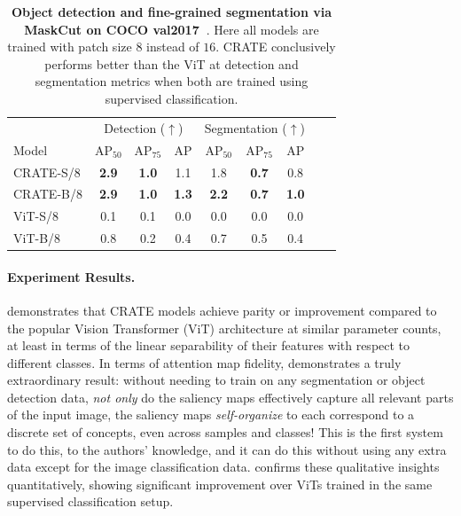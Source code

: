 \documentclass[../../book-main.tex]{subfiles}
\begin{document}
\begin{table}
\caption{\small \textbf{Object detection and fine-grained
    segmentation via MaskCut on COCO {val2017}~\citep{lin2014microsoft}}.
    Here all models are trained with patch size \(8\) instead of \(16\).
    CRATE conclusively performs better than the ViT at detection and
segmentation metrics when both are trained using supervised classification.}
\centering
\begin{tabular}{@{}lcccccccc@{}}
    \toprule
    &  \multicolumn{3}{c}{Detection (\(\uparrow\))} &
    \multicolumn{3}{c}{Segmentation (\(\uparrow\))} \\
    Model & AP$_{50}$ & AP$_{75}$ & AP & AP$_{50}$ & AP$_{75}$ & AP  \\
    \midrule
    CRATE-S/8 & \textbf{2.9} & \textbf{1.0} & 1.1 & 1.8 & \textbf{0.7} & 0.8 \\
    CRATE-B/8 & \textbf{2.9} & \textbf{1.0} & \textbf{1.3} &
    \textbf{2.2} & \textbf{0.7} & \textbf{1.0} \\
    ViT-S/8 & 0.1& 0.1 & 0.0 & 0.0 & 0.0 & 0.0 \\
    ViT-B/8 & 0.8 & 0.2 & 0.4 & 0.7 & 0.5 & 0.4 \\
    \bottomrule
\end{tabular}
\label{tab:crate_detection_segmentation}
\end{table}

\paragraph{Experiment Results.}

 demonstrates that
CRATE models achieve parity or improvement compared to the popular
Vision Transformer (ViT) architecture at similar parameter counts, at
least in terms of the linear separability of their features with
respect to different classes. In terms of attention map fidelity,
 demonstrates a truly extraordinary
result: without needing to train on any segmentation or object
detection data, \textit{not only} do the saliency maps effectively
capture all relevant parts of the input image, the saliency maps
\textit{self-organize} to each correspond to a discrete set of
concepts, even across samples and classes! This is the first system
to do this, to the authors' knowledge, and it can do this without
using any extra data except for the image classification data.
 confirms these qualitative
insights quantitatively, showing significant improvement over ViTs
trained in the same supervised classification setup.
\end{document}
